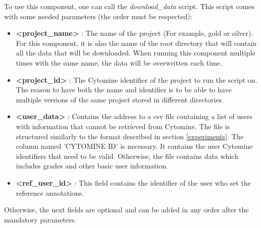 \documentclass[a4paper,11pt]{report}
\numberwithin{figure}{chapter} %
\begin{document}
        To use this component, one can call the \textit{download\_data} script.
        This script comes with some needed parameters (the order must be respected):
        \begin{itemize}
            \item[\textbullet] \textbf{<project\_name>} : The name of the project (For example, gold or silver).
            For this component, it is also the name of the root directory that will contain all the data that will be downloaded.
            When running this component multiple times with the same name, the data will be overwritten each time.
            \item[\textbullet] \textbf{<project\_id>} : The Cytomine identifier of the project to run the script on.
            The reason to have both the name and identifier is to be able to have multiple versions of the same project stored in different directories.
            \item[\textbullet] \textbf{<user\_data>} : Contains the address to a csv file containing a list of users with information that cannot be retrieved from Cytomine.
            The file is structured similarly to the format described in section \ref{experiments}.
            The column named 'CYTOMINE ID' is necessary.
            It contains the user Cytomine identifiers that need to be valid.
            Otherwise, the file contains data which includes grades and other basic user information.
            \item[\textbullet] \textbf{<ref\_user\_id>} : This field contains the identifier of the user who set the reference annotations.
        \end{itemize}
        Otherwise, the next fields are optional and can be added in any order after the mandatory parameters.
\end{document}
